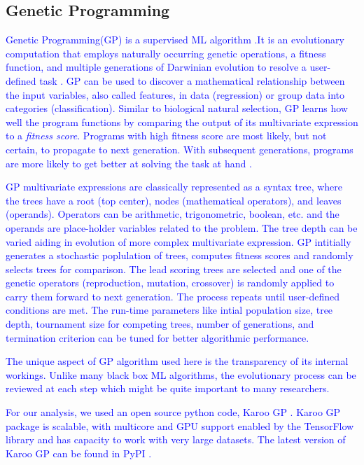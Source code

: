 \subsection{Genetic Programming}
\textcolor{blue}{Genetic Programming(GP) is a supervised ML algorithm \cite{koza_genetic}.It is an evolutionary computation that employs naturally occurring genetic operations, a fitness function, and multiple generations of
Darwinian evolution to resolve a user-defined task \cite{GP_book}. GP can be used to discover a mathematical relationship between the input variables, also called features, in data (regression) or group data into categories (classification). Similar to biological natural selection, GP learns how well the program functions by comparing the output of its multivariate expression to a \emph{fitness score}. Programs with high fitness score are most likely, but not certain, to propagate to next generation. With subsequent generations, programs are more likely to get better at solving the task at hand \cite{Kai_thesis}.} 

\textcolor{blue}{GP multivariate expressions are classically represented as a syntax tree, where the trees have a root (top center), nodes (mathematical operators), and leaves (operands). Operators can be arithmetic, trigonometric, boolean, etc. and the operands are place-holder variables related to the problem. The tree depth can be varied aiding in evolution of more complex multivariate expression. GP intitially generates a stochastic poplulation of trees, computes fitness scores and randomly selects trees for comparison. The lead scoring trees are selected and  one of the genetic operators (reproduction, mutation, crossover) is randomly applied to carry them forward to next generation. The process repeats until user-defined  conditions are met. The run-time parameters like intial population size, tree depth, tournament size for competing trees, number of generations, and termination criterion can be tuned for better algorithmic performance.} %

\textcolor{blue}{The unique aspect of GP algorithm used here is the transparency of its internal workings. Unlike many black box ML algorithms, the evolutionary process can be reviewed at each step which might be quite important to many researchers.\cite{Cavaglia_2020}}

\textcolor{blue}{For our analysis, we used an open source python code, Karoo GP \cite{KarooGP}. Karoo GP package is scalable, with multicore and GPU support enabled by the TensorFlow library and has capacity to work with very large datasets. The latest version of Karoo GP can be found in PyPI \cite{KarooPYPI}.}
